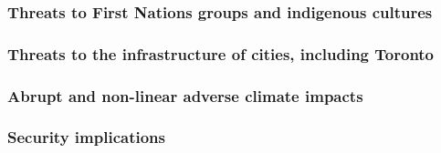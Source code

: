 	
	\subsubsection{Threats to First Nations groups and indigenous cultures}
	
	
	\subsubsection{Threats to the infrastructure of cities, including Toronto}
	
	
	\subsubsection{Abrupt and non-linear adverse climate impacts}



	\subsubsection{Security implications}
	
	
	
